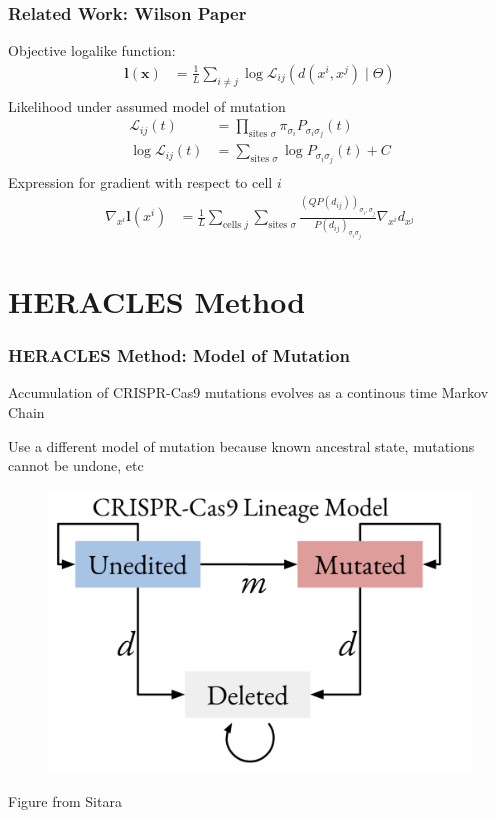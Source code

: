 \documentclass[
	11pt, %
]{beamer}
\begin{document}

\begin{frame}
	\frametitle{Related Work: Wilson Paper}
	Objective logalike function:
	\begin{align*}
		\mathbf{l}(\mathbf{x} )&= \frac{1}{L} \sum_{i \neq j} \log \mathcal{L}_{ij}(d(x^i, x^j) \mid \Theta) \\
	\end{align*}
	Likelihood under assumed model of mutation
	\begin{align*}
		\mathcal{L}_{ij}(t) &= \prod_{\textrm{sites } \sigma} \pi_{\sigma_i} P_{\sigma_i \sigma_j}(t) \\
		\log \mathcal{L}_{ij}(t) &= \sum _{\textrm{sites } \sigma} \log  P_{\sigma_i \sigma_j}(t) + C \\
	\end{align*}
	Expression for gradient with respect to cell $i$
	\begin{align*}
		\nabla_{x^i} \mathbf{l}(x^i) &= \frac{1}{L} \sum_{\textrm{cells } j} \sum_{\textrm{sites } \sigma} \frac{(QP(d_{ij}))_{\sigma_i, \sigma_j}}{P(d_{ij})_{\sigma_i \sigma_j}} \nabla_{x^i} d_{x^j}
	\end{align*}
\end{frame}

\section{HERACLES Method}

\begin{frame}
	\frametitle{HERACLES Method: Model of Mutation}
	Accumulation of CRISPR-Cas9 mutations evolves as a continous time Markov Chain
	\bigskip

	Use a different model of mutation because known ancestral state, mutations cannot be undone, etc
	
	\begin{figure}
		\includegraphics[width=0.55 \linewidth]{crispr-lineage-model.png}
	\end{figure}
	Figure from Sitara
\end{frame}
\end{document}
